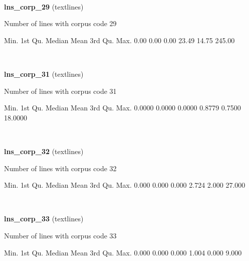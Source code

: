 \documentclass[]{article}
\newenvironment{Shaded}{\begin{snugshade}}{\end{snugshade}}
\newcommand{\FloatTok}[1]{\textcolor[rgb]{0.00,0.00,0.81}{{#1}}}
\newcommand{\NormalTok}[1]{{#1}}
\begin{document}
~

\vspace{1em}

\textbf{lns\_corp\_29} (textlines)

Number of lines with corpus code 29

\begin{Shaded}
\begin{Highlighting}[]
   \NormalTok{Min. 1st Qu.  Median    Mean 3rd Qu.    Max. }
   \FloatTok{0.00}    \FloatTok{0.00}    \FloatTok{0.00}   \FloatTok{23.49}   \FloatTok{14.75}  \FloatTok{245.00} 
\end{Highlighting}
\end{Shaded}

~

\vspace{1em}

\textbf{lns\_corp\_31} (textlines)

Number of lines with corpus code 31

\begin{Shaded}
\begin{Highlighting}[]
   \NormalTok{Min. 1st Qu.  Median    Mean 3rd Qu.    Max. }
 \FloatTok{0.0000}  \FloatTok{0.0000}  \FloatTok{0.0000}  \FloatTok{0.8779}  \FloatTok{0.7500} \FloatTok{18.0000} 
\end{Highlighting}
\end{Shaded}

~

\vspace{1em}

\textbf{lns\_corp\_32} (textlines)

Number of lines with corpus code 32

\begin{Shaded}
\begin{Highlighting}[]
   \NormalTok{Min. 1st Qu.  Median    Mean 3rd Qu.    Max. }
  \FloatTok{0.000}   \FloatTok{0.000}   \FloatTok{0.000}   \FloatTok{2.724}   \FloatTok{2.000}  \FloatTok{27.000} 
\end{Highlighting}
\end{Shaded}

~

\vspace{1em}

\textbf{lns\_corp\_33} (textlines)

Number of lines with corpus code 33

\begin{Shaded}
\begin{Highlighting}[]
   \NormalTok{Min. 1st Qu.  Median    Mean 3rd Qu.    Max. }
  \FloatTok{0.000}   \FloatTok{0.000}   \FloatTok{0.000}   \FloatTok{1.004}   \FloatTok{0.000}   \FloatTok{9.000} 
\end{Highlighting}
\end{Shaded}
\end{document}
